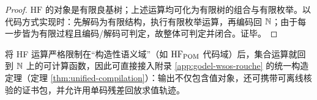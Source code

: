 \begin{proof}
$\mathrm{HF}$ 的对象是有限良基树；上述运算均可化为有限树的组合与有限枚举。以代码方式实现时：先解码为有限结构，执行有限枚举运算，再编码回 $\mathbb{N}$；由于每一步皆为有限过程且编码/解码可判定，故整体可判定并闭合。证毕。
\end{proof}

\begin{remark}[与统一构造定理的对接]
将 HF 运算严格限制在“构造性语义域”（如 $\mathrm{HF}_{\mathrm{POM}}$ 代码域）后，集合运算就回到 $\mathbb{N}$ 上的可计算函数，因此可直接接入附录 \ref{app:godel-wsos-rouche} 的统一构造定理（定理 \ref{thm:unified-compilation}）：输出不仅包含值对象，还可携带可离线核验的证书包，并允许用单码残差回放求值轨迹。
\end{remark}

